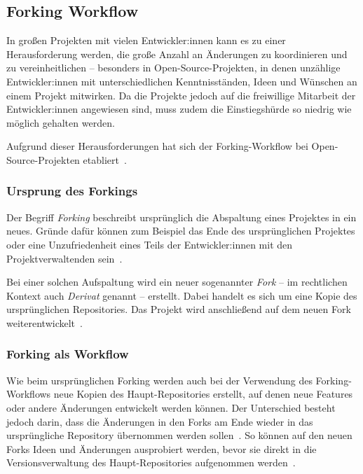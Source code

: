 
\subsection{Forking Workflow}
\label{sec:workflows:forking}

In großen Projekten mit vielen Entwickler:innen kann es zu einer Herausforderung werden, die große Anzahl an Änderungen zu koordinieren und zu vereinheitlichen -- besonders in Open\hyp Source\hyp Projekten, in denen unzählige Entwickler:innen mit unterschiedlichen Kenntnisständen, Ideen und Wünschen an einem Projekt mitwirken. Da die Projekte jedoch auf die freiwillige Mitarbeit der Entwickler:innen angewiesen sind, muss zudem die Einstiegshürde so niedrig wie möglich gehalten werden.

Aufgrund dieser Herausforderungen hat sich der Forking\hyp Workflow bei Open\hyp Source\hyp Projekten etabliert~\cite{atlassianForkingWorkflow}.


\subsubsection{Ursprung des Forkings}

Der Begriff \emph{Forking} beschreibt ursprünglich die Abspaltung eines Projektes in ein neues. Gründe dafür können zum Beispiel das Ende des ursprünglichen Projektes oder eine Unzufriedenheit eines Teils der Entwickler:innen mit den Projektverwaltenden sein~\cite{whyDoOpenSourceProjectsFork?}.

Bei einer solchen Aufspaltung wird ein neuer sogenannter \emph{Fork} -- im rechtlichen Kontext auch \emph{Derivat} genannt -- erstellt. Dabei handelt es sich um eine Kopie des ursprünglichen Repositories. Das Projekt wird anschließend auf dem neuen Fork weiterentwickelt~\cite{devInsiderWasIstEinFork?}.


\subsubsection{Forking als Workflow}

Wie beim ursprünglichen Forking werden auch bei der Verwendung des Forking\hyp Workflows neue Kopien des Haupt\hyp Repositories erstellt, auf denen neue Features oder andere Änderungen entwickelt werden können. Der Unterschied besteht jedoch darin, dass die Änderungen in den Forks am Ende wieder in das ursprüngliche Repository übernommen werden sollen~\cite{gitHubInformationenZuForks}. So können auf den neuen Forks Ideen und Änderungen ausprobiert werden, bevor sie direkt in die Versionsverwaltung des Haupt\hyp Repositories aufgenommen werden~\cite{gitHubInformationenZuForks}.

